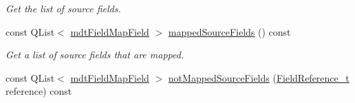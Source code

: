 \begin{DoxyCompactItemize}
\begin{DoxyCompactList}\small\item\em Get the list of source fields. \end{DoxyCompactList}\item 
const QList$<$ \hyperlink{classmdt_field_map_field}{mdtFieldMapField} $>$ \hyperlink{classmdt_field_map_a289b3eddb87f74e61935e92ed77ff065}{mappedSourceFields} () const 
\begin{DoxyCompactList}\small\item\em Get a list of source fields that are mapped. \end{DoxyCompactList}\item 
\hypertarget{classmdt_field_map_a32c026ccb54a4b783b77963bcbfd9212}{
const QList$<$ \hyperlink{classmdt_field_map_field}{mdtFieldMapField} $>$ \hyperlink{classmdt_field_map_a32c026ccb54a4b783b77963bcbfd9212}{notMappedSourceFields} (\hyperlink{classmdt_field_map_a8a8dd62273d396d926bf3df837407392}{FieldReference\_\-t} reference) const }
\label{classmdt_field_map_a32c026ccb54a4b783b77963bcbfd9212}


\end{DoxyCompactItemize}
